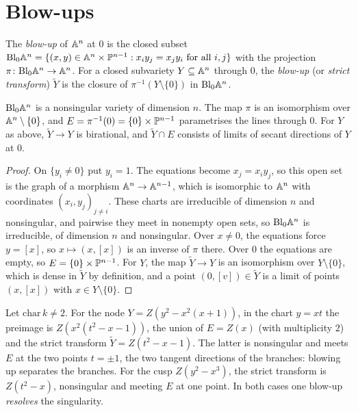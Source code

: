 \section{Blow-ups}\label{varieties:section-blowups}

\begin{definition}\label{varieties:definition-blowup}
The \emph{blow-up} of $\mathbb{A}^n$ at $0$ is the closed subset $\mathrm{Bl}_0\mathbb{A}^n = \{(x, y) \in \mathbb{A}^n \times \mathbb{P}^{n-1} : x_iy_j = x_jy_i \text{ for all } i, j\}$
with the projection $\pi \colon \mathrm{Bl}_0\mathbb{A}^n \to \mathbb{A}^n$. For a closed subvariety $Y \subseteq \mathbb{A}^n$ through $0$, the \emph{blow-up} (or
\emph{strict transform}) $\tilde Y$ is the closure of $\pi^{-1}(Y \setminus \{0\})$ in $\mathrm{Bl}_0\mathbb{A}^n$.
\end{definition}

\begin{proposition}\label{varieties:proposition-blowup}
$\mathrm{Bl}_0\mathbb{A}^n$ is a nonsingular variety of dimension $n$. The map $\pi$ is an isomorphism over $\mathbb{A}^n \setminus \{0\}$, and
$E = \pi^{-1}(0) = \{0\} \times \mathbb{P}^{n-1}$ parametrises the lines through $0$. For $Y$ as above, $\tilde Y \to Y$ is birational, and
$\tilde Y \cap E$ consists of limits of secant directions of $Y$ at $0$.
\end{proposition}

\begin{proof}
On $\{y_i \neq 0\}$ put $y_i = 1$. The equations become $x_j = x_iy_j$, so this open set is the graph of a morphism $\mathbb{A}^n \to \mathbb{A}^{n-1}$, which is
isomorphic to $\mathbb{A}^n$ with coordinates $(x_i, y_j)_{j \neq i}$. These charts are irreducible of dimension $n$ and nonsingular, and pairwise they
meet in nonempty open sets, so $\mathrm{Bl}_0\mathbb{A}^n$ is irreducible, of dimension $n$ and nonsingular. Over $x \neq 0$, the equations force
$y = [x]$, so $x \mapsto (x, [x])$ is an inverse of $\pi$ there. Over $0$ the equations are empty, so $E = \{0\} \times \mathbb{P}^{n-1}$. For $Y$, the map
$\tilde Y \to Y$ is an isomorphism over $Y \setminus \{0\}$, which is dense in $\tilde Y$ by definition, and a point $(0, [v]) \in \tilde Y$ is a limit
of points $(x, [x])$ with $x \in Y \setminus \{0\}$.
\end{proof}

\begin{example}\label{varieties:example-blowup-curves}
Let $\mathrm{char}\,k \neq 2$. For the node $Y = Z(y^2 - x^2(x + 1))$, in the chart $y = xt$ the preimage is $Z(x^2(t^2 - x - 1))$, the union of $E = Z(x)$
(with multiplicity $2$) and the strict transform $\tilde Y = Z(t^2 - x - 1)$. The latter is nonsingular and meets $E$ at the two points $t = \pm 1$,
the two tangent directions of the branches: blowing up separates the branches. For the cusp $Z(y^2 - x^3)$, the strict transform is
$Z(t^2 - x)$, nonsingular and meeting $E$ at one point. In both cases one blow-up \emph{resolves} the singularity.
\end{example}

